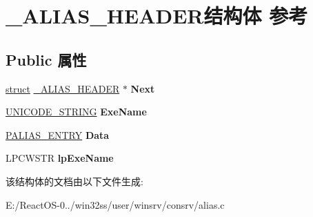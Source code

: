 \hypertarget{struct___a_l_i_a_s___h_e_a_d_e_r}{}\section{\+\_\+\+A\+L\+I\+A\+S\+\_\+\+H\+E\+A\+D\+E\+R结构体 参考}
\label{struct___a_l_i_a_s___h_e_a_d_e_r}
\subsection*{Public 属性}
\begin{DoxyCompactItemize}
\item 
\mbox{\label{struct___a_l_i_a_s___h_e_a_d_e_r_a17c1dea65e482b69fc535a4b7f8373d0}} 
\hyperlink{interfacestruct}{struct} \hyperlink{struct___a_l_i_a_s___h_e_a_d_e_r}{\+\_\+\+A\+L\+I\+A\+S\+\_\+\+H\+E\+A\+D\+ER} $\ast$ {\bfseries Next}
\item 
\mbox{\label{struct___a_l_i_a_s___h_e_a_d_e_r_aae86b721f9a08caeb10423e4b15af453}} 
\hyperlink{struct___u_n_i_c_o_d_e___s_t_r_i_n_g}{U\+N\+I\+C\+O\+D\+E\+\_\+\+S\+T\+R\+I\+NG} {\bfseries Exe\+Name}
\item 
\mbox{\label{struct___a_l_i_a_s___h_e_a_d_e_r_a0dd67c2f76e26247f155a4c362fdcf1d}} 
\hyperlink{struct___a_l_i_a_s___e_n_t_r_y}{P\+A\+L\+I\+A\+S\+\_\+\+E\+N\+T\+RY} {\bfseries Data}
\item 
\mbox{\label{struct___a_l_i_a_s___h_e_a_d_e_r_a23cd3dc37924ae269c4f36b572e38f59}} 
L\+P\+C\+W\+S\+TR {\bfseries lp\+Exe\+Name}
\end{DoxyCompactItemize}


该结构体的文档由以下文件生成\+:\begin{DoxyCompactItemize}
\item 
E\+:/\+React\+O\+S-\/0../win32ss/user/winsrv/consrv/alias.\+c\end{DoxyCompactItemize}
